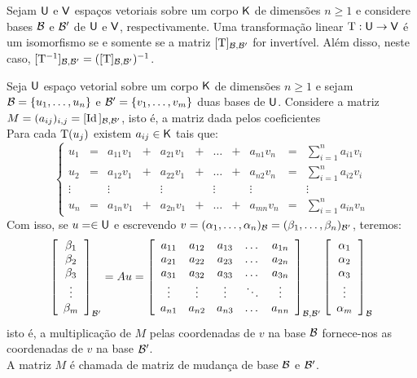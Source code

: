 \documentclass[10pt,a4paper]{book}
\begin{document}
\begin{corollary}
	Sejam $\mathsf{ U }$ e $\mathsf{ V }$ espaços vetoriais sobre um corpo $\mathsf{ K }$ de dimensões $n \geq 1$ e considere bases $\mathcal{ B }$ e $\mathcal{ B }'$ de $\mathsf{ U }$ e $\mathsf{ V }$, respectivamente. Uma transformação linear $\mathrm{ T } : \mathsf{ U } \rightarrow \mathsf{ V }$ é um isomorfismo se e somente se a matriz $[\mathrm{ T }]_{\mathcal{ B }, \mathcal{ B }'}$ for invertível. Além disso, neste caso, $[\mathrm{ T ^ {-1}}]_{\mathcal{ B }, \mathcal{ B }'} = ([\mathrm{ T }]_{\mathcal{ B }, \mathcal{ B }'})^{-1}$.
\end{corollary}

\begin{definition}
	Seja $\mathsf{ U }$ espaço vetorial sobre um corpo $\mathsf{ K }$ de dimensões $n \geq 1$ e sejam $\mathcal{ B } = \{ u_1, \dots, u_n \}$ e $\mathcal{ B }' = \{ v_1, \dots, v_m \}$ duas bases de $\mathsf{ U }$. Considere a matriz $M = (a_{ij})_{i,j} = [\mathrm{ Id }\,]_{\mathcal{ B }, \mathcal{ B }'}$, isto é, a matriz dada pelos coeficientes \\
	Para cada $\mathrm{ T }(u_j)$ existem $a_{ij} \in \mathsf{ K }$ tais que:
	\[
		\left\{\begin{array}{cccccccccccc}
			u_1 &=& a_{11} v_1 &+& a_{21} v_1 &+& \dots  &+& a_{n1} v_n &=& \displaystyle\sum_{i = 1}^{n} a_{i1} v_i\\
			u_2 &=& a_{12} v_1 &+& a_{22} v_1 &+& \dots  &+& a_{n2} v_n &=& \displaystyle\sum_{i = 1}^{n} a_{i2} v_i\\
			\vdots & & \vdots     & & \vdots     & & \vdots & & \vdots     & & \vdots                     \\
			u_n &=& a_{1n} v_1 &+& a_{2n} v_1 &+& \dots  &+& a_{mn} v_n &=& \displaystyle\sum_{i = 1}^{n} a_{in} v_n
		\end{array}\right.
	\]
	Com isso, se $u = \in \mathsf{ U }$ e escrevendo $v = (\alpha_1, \dots, \alpha_n)_{\mathcal{ B }} = (\beta_1, \dots, \beta_n)_{\mathcal{ B }'}$, teremos:
	\[
		\left[\begin{array}{c}
			\beta_1 \\
			\beta_2 \\
			\beta_3 \\
			\vdots \\
			\beta_m
		\end{array}\right]_{\mathcal{ B }'}
		= Au = 
		\left[\begin{array}{ccccc}
			a_{11} & a_{12} & a_{13} & \dots  & a_{1n} \\
			a_{21} & a_{22} & a_{23} & \dots  & a_{2n} \\
			a_{31} & a_{32} & a_{33} & \dots  & a_{3n} \\
			\vdots & \vdots & \vdots & \ddots & \vdots \\
			a_{n1} & a_{n2} & a_{n3} & \dots  & a_{nn} 
		\end{array}\right]_{\mathcal{ B }, \mathcal{ B }'}
		\left[\begin{array}{c}
			\alpha_1 \\
			\alpha_2 \\
			\alpha_3 \\
			\vdots \\
			\alpha_m
		\end{array}\right]_{\mathcal{ B }}
	\]
	isto é, a multiplicação de $M$ pelas coordenadas de $v$ na base $\mathcal{ B }$ fornece-nos as coordenadas de $v$ na base $\mathcal{ B }'$.\\
	A matriz $M$ é chamada de matriz de mudança de base $\mathcal{ B }$ e $\mathcal{ B }'$.
\end{definition}
\end{document}
